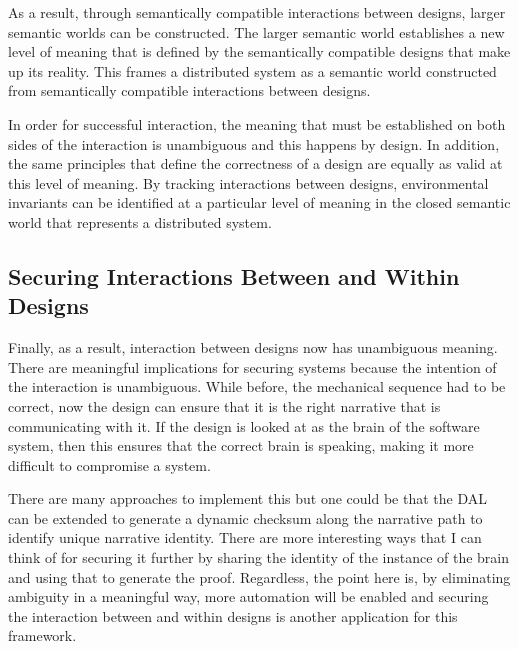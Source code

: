 As a result, through semantically compatible interactions between designs, larger semantic worlds can be constructed. The larger semantic world establishes a new level of meaning that is defined by the semantically compatible designs that make up its reality. This frames a distributed system as a semantic world constructed from semantically compatible interactions between designs.

In order for successful interaction, the meaning that must be established on both sides of the interaction is unambiguous and this happens by design. In addition, the same principles that define the correctness of a design are equally as valid at this level of meaning. By tracking interactions between designs, environmental invariants can be identified at a particular level of meaning in the closed semantic world that represents a distributed system.

\subsection{Securing Interactions Between and Within Designs}

Finally, as a result, interaction between designs now has unambiguous meaning. There are meaningful implications for securing systems because the intention of the interaction is unambiguous. While before, the mechanical sequence had to be correct, now the design can ensure that it is the right narrative that is communicating with it. If the design is looked at as the brain of the software system, then this ensures that the correct brain is speaking, making it more difficult to compromise a system.

There are many approaches to implement this but one could be that the DAL can be extended to generate a dynamic checksum along the narrative path to identify unique narrative identity. There are more interesting ways that I can think of for securing it further by sharing the identity of the instance of the brain and using that to generate the proof. Regardless, the point here is, by eliminating ambiguity in a meaningful way, more automation will be enabled and securing the interaction between and within designs is another application for this framework.